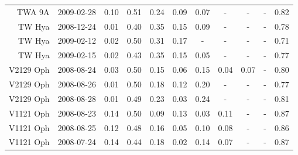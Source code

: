 \documentclass{aa}
\begin{document}
\begin{appendix}
\begin{table}
\begin{tabular}{r c c c  c c c c c c c}
TWA 9A      &	2009-02-28 &	0.10	 & 0.51	& 0.24	& 0.09	& 0.07	& -	& -	& -	& 0.82	 \\
TW Hya      &	2008-12-24 &	0.01	 & 0.40	& 0.35	& 0.15	& 0.09	& -	& -	& -	& 0.78	 \\
TW Hya      &	2009-02-12 &	0.02	 & 0.50	& 0.31	& 0.17	& -	& -	& -	& -	& 0.71	 \\
TW Hya      &	2009-02-15 &	0.02	 & 0.43	& 0.35	& 0.15	& 0.05	& -	& -	& -	& 0.77	 \\
V2129 Oph   &	2008-08-24 &	0.03	 & 0.50	& 0.15	& 0.06	& 0.15	& 0.04	& 0.07	& -	& 0.80	 \\
V2129 Oph   &	2008-08-26 &	0.01	 & 0.50	& 0.18	& 0.12	& 0.20	& -	& -	& -	& 0.77	 \\
V2129 Oph   &	2008-08-28 &	0.01	 & 0.49	& 0.23	& 0.03	& 0.24	& -	& -	& -	& 0.81	 \\
V1121 Oph   &	2008-08-23 &	0.14	 & 0.50	& 0.09	& 0.13	& 0.03	& 0.11	& -	& -	& 0.87	 \\
V1121 Oph   &	2008-08-25 &	0.12	 & 0.48	& 0.16	& 0.05	& 0.10	& 0.08	& -	& -	& 0.86	 \\
V1121 Oph   &	2008-07-24 &	0.14	 & 0.44	& 0.18	& 0.02	& 0.14	& 0.07	& -	& -	& 0.87	 \\
\hline
\end{tabular}
\end{table}
\end{appendix}

\end{document}
